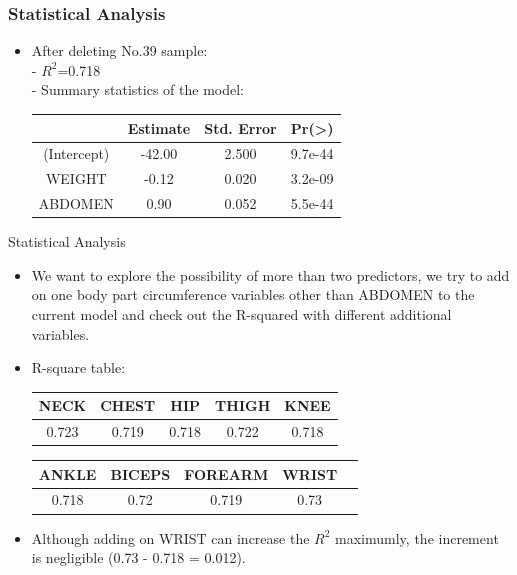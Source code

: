 \documentclass{beamer}
\begin{document}
\begin{frame}
\frametitle{Statistical Analysis} 
\begin{itemize}
    \item After deleting No.39 sample:\\
    - $R^2$=0.718\\
    - Summary statistics of the model:
            \begin{table}
	        \centering
        	\begin{tabular}{cccc}  
	        	\toprule
	        	& Estimate &	Std. Error & Pr(\textgreater\abs{t})\\  
	        	\midrule        %
	        	 (Intercept) &	-42.00 &	2.500 &	9.7e-44 \\
	           	WEIGHT &	-0.12 &	0.020 &	3.2e-09 \\
		         ABDOMEN &	0.90 &	0.052 &	5.5e-44 \\
	        	\bottomrule
        	\end{tabular}
        \end{table}
\end{itemize}


\end{frame}



\begin{frame}{Statistical Analysis}
\begin{itemize}
    \item We want to explore the possibility of more than two predictors, we try to add on one body part circumference variables other than ABDOMEN to the current model and check out the R-squared with different additional variables.
    \item  R-square table:
        \begin{center}
        \begin{tabular}{ccccc}\toprule
        NECK &	CHEST &	HIP &	THIGH &	KNEE \\
        \hline
        0.723 &	0.719 &	0.718 &	0.722 &	0.718 \\
        \bottomrule
        \end{tabular}
        
        \begin{tabular}{ccccc}\toprule
         ANKLE &	BICEPS & FOREARM &	WRIST\\
        \hline
        0.718 &	0.72 &	0.719 &	0.73\\
        \bottomrule
        \end{tabular}

        \end{center}
       

    \item Although adding on WRIST can increase the $R^2$ maximumly, the increment is negligible (0.73 - 0.718 = 0.012).
\end{itemize}

\end{frame}
\end{document}
